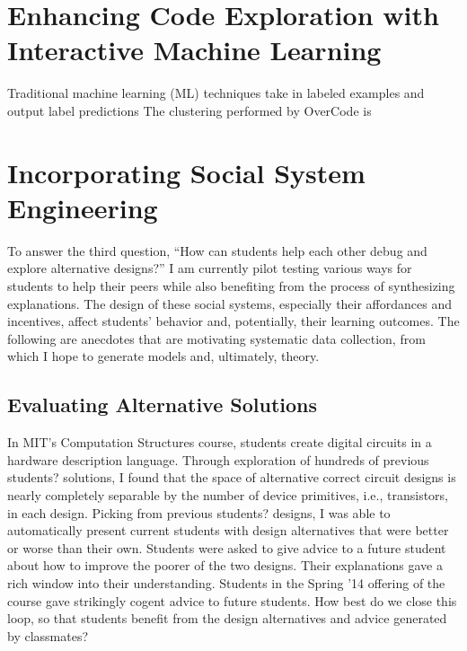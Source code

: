 \documentclass{sigchi}
\begin{document}
\section{Enhancing Code Exploration with Interactive Machine Learning}

Traditional machine learning (ML) techniques take in labeled examples and output label predictions The clustering performed by OverCode is 

\section{Incorporating Social System Engineering}
To answer the third question, ``How can students help each other debug and explore alternative designs?'' I am currently pilot testing various ways for students to help their peers while also benefiting from the process of synthesizing explanations. The design of these social systems, especially their affordances and incentives, affect students' behavior and, potentially, their learning outcomes. The following are anecdotes that are motivating systematic data collection, from which I hope to generate models and, ultimately, theory.

\subsection{Evaluating Alternative Solutions} In MIT's Computation Structures course, students create digital circuits in a hardware description language. Through exploration of hundreds of previous students? solutions, I found that the space of alternative correct circuit designs is nearly completely separable by the number of device primitives, i.e., transistors, in each design. Picking from previous students? designs, I was able to automatically present current students with design alternatives that were better or worse than their own. Students were asked to give advice to a future student about how to improve the poorer of the two designs. Their explanations gave a rich window into their understanding. Students in the Spring '14 offering of the course gave strikingly cogent advice to future students. How best do we close this loop, so that students benefit from the design alternatives and advice generated by classmates? 
\end{document}
